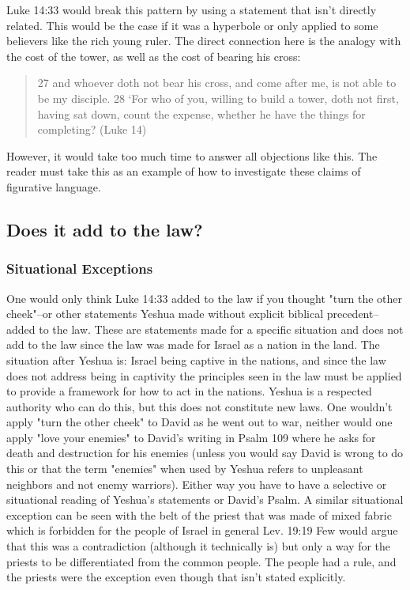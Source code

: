 \documentclass[11pt]{article}
\begin{document}
Luke 14:33 would break this pattern by using a statement that isn't directly related. This would be the case if it was a hyperbole or only applied to some believers like the rich young ruler. The direct connection here is the analogy with the cost of the tower, as well as the cost of bearing his cross: 
\begin{quote}
27 and whoever doth not bear his cross, and come after me, is not able to be my disciple. 28 `For who of you, willing to build a tower, doth not first, having sat down, count the expense, whether he have the things for completing? (Luke 14)
\end{quote}
 However, it would take too much time to answer all objections like this. The reader must take this as an example of how to investigate these claims of figurative language. 

\subsection{Does it add to the law?}
\subsubsection{Situational Exceptions} %
One would only think Luke 14:33 added to the law if you thought "turn the other cheek"--or other statements Yeshua made without explicit biblical precedent--added to the law. These are statements made for a specific situation and does not add to the law since the law was made for Israel as a nation in the land. The situation after Yeshua is: Israel being captive in the nations, and since the law does not address being in captivity the principles seen in the law must be applied to provide a framework for how to act in the nations. Yeshua is a respected authority who can do this, but this does not constitute new laws. One wouldn't apply "turn the other cheek" to David as he went out to war, neither would one apply "love your enemies" to David's writing in Psalm 109 where he asks for death and destruction for his enemies (unless you would say David is wrong to do this or that the term "enemies" when used by Yeshua refers to unpleasant neighbors and not enemy warriors). Either way you have to have a selective or situational reading of Yeshua's statements or David's Psalm. A similar situational exception can be seen with the belt of the priest that was made of mixed fabric which is forbidden for the people of Israel in general Lev. 19:19 \cite{shatnez} Few would argue that this was a contradiction (although it technically is) but only a way for the priests to be differentiated from the common people. The people had a rule, and the priests were the exception even though that isn't stated explicitly. 
\end{document}

